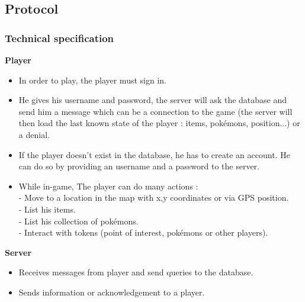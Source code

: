 \documentclass[a4paper,09pt]{article}
\begin{document}




\subsection{Protocol}


\subsubsection{Technical specification}

\textbf{Player}

\begin{itemize}
\item In order to play, the player must sign in.
\item He gives his username and password, the server will ask the database and
  send him a message which can be a connection to the game (the server will
  then load the last known state of the player : items, pokémons, position...)
  or a denial.
\item If the player doesn't exist in the database, he has to create an account.
  He can do so by providing an username and a password to the server.
\item While in-game, The player can do many actions :\\
- Move to a location in the map with x,y coordinates or via GPS position.\\
- List his items.\\
- List his collection of pokémons.\\
- Interact with tokens (point of interest, pokémons or other players).\\
\end{itemize}

\textbf{Server}
\begin{itemize}
\item Receives messages from player and send queries to the database.
\item Sends information or acknowledgement to a player.\\
\end{itemize}
\end{document}

